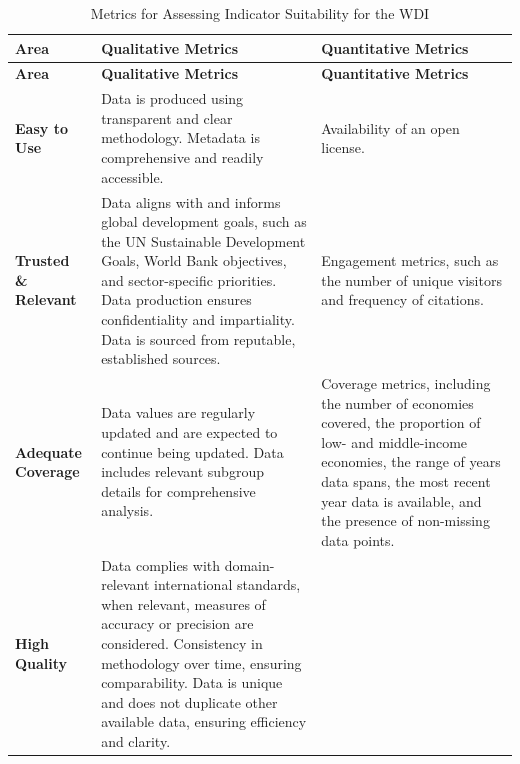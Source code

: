 \documentclass[
  11pt,
  a4paper,
  DIV=11,
  numbers=noendperiod]{scrreprt}
\begin{document}
\begin{longtable}[]{@{}
  >{\raggedright\arraybackslash}p{}
  >{\raggedright\arraybackslash}p{}
  >{\raggedright\arraybackslash}p{}@{}}
\caption{Metrics for Assessing Indicator Suitability for the
WDI}\label{tbl-2_2}\tabularnewline
\toprule\noalign{}
\begin{minipage}[b]{\linewidth}\raggedright
\textbf{Area}
\end{minipage} & \begin{minipage}[b]{\linewidth}\raggedright
\textbf{Qualitative Metrics}
\end{minipage} & \begin{minipage}[b]{\linewidth}\raggedright
\textbf{Quantitative Metrics}
\end{minipage} \\
\midrule\noalign{}
\endfirsthead
\toprule\noalign{}
\begin{minipage}[b]{\linewidth}\raggedright
\textbf{Area}
\end{minipage} & \begin{minipage}[b]{\linewidth}\raggedright
\textbf{Qualitative Metrics}
\end{minipage} & \begin{minipage}[b]{\linewidth}\raggedright
\textbf{Quantitative Metrics}
\end{minipage} \\
\midrule\noalign{}
\endhead
\bottomrule\noalign{}
\endlastfoot
\textbf{Easy to Use} & Data is produced using transparent and clear
methodology. Metadata is comprehensive and readily accessible. &
Availability of an open license. \\
\textbf{Trusted \& Relevant} & Data aligns with and informs global
development goals, such as the UN Sustainable Development Goals, World
Bank objectives, and sector-specific priorities. Data production ensures
confidentiality and impartiality. Data is sourced from reputable,
established sources. & Engagement metrics, such as the number of unique
visitors and frequency of citations. \\
\textbf{Adequate Coverage} & Data values are regularly updated and are
expected to continue being updated. Data includes relevant subgroup
details for comprehensive analysis. & Coverage metrics, including the
number of economies covered, the proportion of low- and middle-income
economies, the range of years data spans, the most recent year data is
available, and the presence of non-missing data points. \\
\textbf{High Quality} & Data complies with domain-relevant international
standards, when relevant, measures of accuracy or precision are
considered. Consistency in methodology over time, ensuring
comparability. Data is unique and does not duplicate other available
data, ensuring efficiency and clarity. & \\
\end{longtable}
\end{document}
